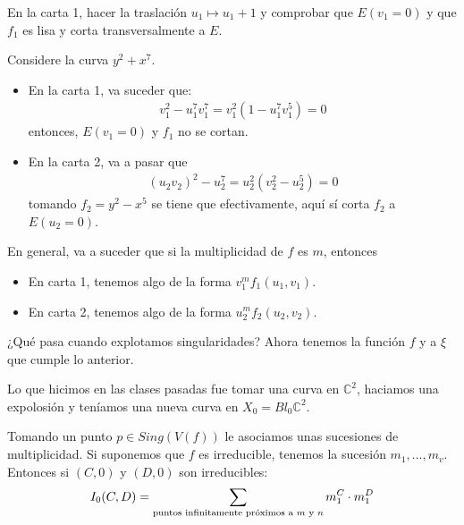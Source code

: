 \documentclass[12pt]{report}
\newcounter{it}
\theoremstyle{largebreak}
\begin{document}
    \begin{excer}
        En la carta 1, hacer la traslación $u_1\mapsto u_1+1$ y comprobar que $E(v_1=0)$ y que $f_1$ es lisa y corta transversalmente a $E$.
    \end{excer}

    \begin{exa}
        Considere la curva $y^2+x^7$.
        \begin{itemize}
            \item En la carta 1, va suceder que:
            \begin{equation*}
                \begin{split}
                    v_1^2-u_1^7v_1^7=v_1^2(1-u_1^7v_1^5)=0
                \end{split}
            \end{equation*}
            entonces, $E(v_1=0)$ y $f_1$ no se cortan.
            \item En la carta 2, va a pasar que
            \begin{equation*}
                \begin{split}
                    (u_2v_2)^2-u_2^7=u_2^2(v_2^2-u_2^5)=0
                \end{split}
            \end{equation*}
            tomando $f_2=y^2-x^5$ se tiene que efectivamente, aquí sí corta $f_2$ a $E(u_2=0)$.
        \end{itemize}
    \end{exa}

    \begin{obs}
        En general, va a suceder que si la multiplicidad de $f$ es $m$, entonces
        \begin{itemize}
            \item En carta 1, tenemos algo de la forma $v_1^mf_1(u_1,v_1)$.
            \item En carta 2, tenemos algo de la forma $u_2^mf_2(u_2,v_2)$.
        \end{itemize}
    \end{obs}

    ¿Qué pasa cuando explotamos singularidades? Ahora tenemos la función $f$ y a $\xi$ que cumple lo anterior.

    Lo que hicimos en las clases pasadas fue tomar una curva en $\mathbb{C}^2$, haciamos una expolosión y teníamos una nueva curva en $X_0=Bl_0\mathbb{C}^2$.

    Tomando un punto $p\in Sing(V(f))$ le asociamos unas sucesiones de multiplicidad. Si suponemos que $f$ es irreducible, tenemos la sucesión $m_1,...,m_v$. Entonces si $(C,0)$ y $(D,0)$ son irreducibles:
    \begin{equation*}
        I_0(C,D)=\sum_{ \textup{puntos infinitamente próximos a $m$ y $n$}}m_1^C\cdot m_1^D
    \end{equation*}
\end{document}
